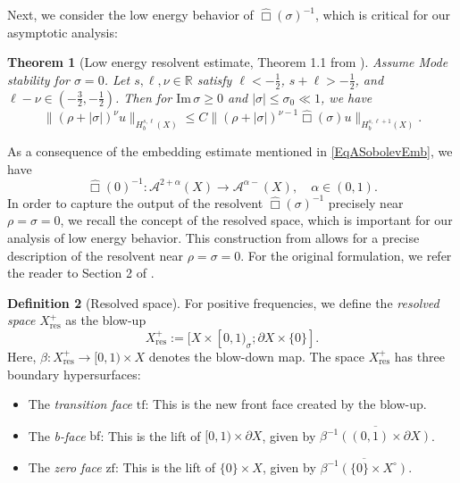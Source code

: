 \documentclass[10pt,a4paper,reqno]{amsart}
\renewcommand{\Im}{\operatorname{Im}}
\newtheorem{theorem}{Theorem}[section]
\theoremstyle{definition}
\newtheorem{definition}[theorem]{Definition}
\theoremstyle{remark}
\numberwithin{equation}{section}
\renewcommand{\Im}{\mathrm{Im}\,}
\newcommand{\cA}{\mathcal A}
\newcommand{\wh}{\widehat}
\begin{document}
Next, we consider the low energy behavior of $\wh\Box(\sigma)^{-1}$, which is critical for our asymptotic analysis:

\begin{theorem}[Low energy resolvent estimate, Theorem 1.1 from \cite{VasyLowEnergyLag}]
\label{thm:low_energy}
Assume Mode stability for $\sigma = 0$. Let $s, \ell, \nu \in \mathbb{R}$ satisfy $\ell < -\frac{1}{2}$, $s + \ell > -\frac{1}{2}$, and $\ell - \nu \in (-\frac{3}{2}, -\frac{1}{2})$. Then for $\Im\sigma \geq 0$ and $|\sigma| \leq \sigma_0 \ll 1$, we have
\[
\|(\rho + |\sigma|)^\nu u\|_{H_b^{s,\ell}(X)} \leq C\|(\rho + |\sigma|)^{\nu-1}\wh\Box(\sigma)u\|_{H_b^{s,\ell+1}(X)}.
\]
\end{theorem}


As a consequence of the embedding estimate mentioned in \eqref{EqASobolevEmb}, we have
\begin{equation}
\label{EqAZeroMapping}
  \wh\Box(0)^{-1} \colon \cA^{2+\alpha}(X) \to \cA^{\alpha-}(X),\quad \alpha\in(0,1).
\end{equation}
In order to capture the output of the resolvent $\wh\Box(\sigma)^{-1}$ precisely near $\rho=\sigma=0$, we recall the concept of the resolved space, which is important for our analysis of low energy behavior. This construction from \cite{Hin22} allows for a precise description of the resolvent near $\rho = \sigma = 0$. For the original formulation, we refer the reader to Section 2 of \cite{Hin22}.

\begin{definition}[Resolved space]
\label{def:resolved_space}
For positive frequencies, we define the \emph{resolved space} $X^+_{\text{res}}$ as the blow-up
\[
X^+_{\text{res}} := [X \times [0,1)_\sigma; \partial X \times \{0\}].
\]
Here, $\beta: X^+_{\text{res}} \to [0,1) \times X$ denotes the blow-down map. The space $X^+_{\text{res}}$ has three boundary hypersurfaces:

\begin{itemize}
\item The \textit{transition face} $\text{tf}$: This is the new front face created by the blow-up.
\item The \textit{b-face} $\text{bf}$: This is the lift of $[0,1) \times \partial X$, given by $\overline{\beta^{-1}((0,1) \times \partial X)}$.
\item The \textit{zero face} $\text{zf}$: This is the lift of $\{0\} \times X$, given by $\overline{\beta^{-1}(\{0\} \times X^\circ)}$.
\end{itemize}
\end{definition}
\end{document}
